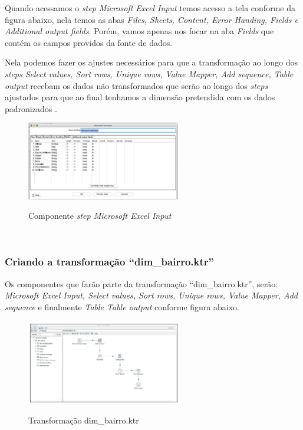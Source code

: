 Quando acessamos o \textit{step Microsoft Excel Input} temos acesso a tela conforme da figura abaixo, nela temos as abas \textit{Files, Sheets, Content, Error Handing, Fields e Additional output fields}. Por\'{e}m, vamos apenas nos focar na aba \textit{Fields} que cont\'{e}m os campos providos da fonte de dados. 

Nela podemos fazer os ajustes necess\'{a}rios para que a transforma\c{c}\~{a}o ao longo dos \textit{steps Select values, Sort rows, Unique rows, Value Mapper, Add sequence, Table output} recebam os dados n\~{a}o transformados que ser\~{a}o ao longo dos \textit{steps} ajustados para que ao final tenhamos a dimens\~{a}o pretendida com os dados padronizados .

\begin{figure}[H]
	\vspace*{0,2cm}
    \centering
    \caption{Componente \textit{step Microsoft Excel Input}}
    \includegraphics[width=0.6\textwidth]{./04-figuras/figura-componente-step-mei.png}
    \label{fig:ilustfigcomponentestepmei}
\end{figure}
\vspace*{-0,9cm}
{\raggedright {}} \\


\subsubsection{Criando a transforma\c{c}\~{a}o ``dim\_bairro.ktr''}

Os componentes que far\~{a}o parte da transforma\c{c}\~{a}o ``dim\_bairro.ktr'', ser\~{a}o: \textit{Microsoft Excel Input, Select values, Sort rows, Unique rows, Value Mapper, Add sequence} e finalmente \textit{Table Table output} conforme figura abaixo.

\begin{figure}[H]
	\vspace*{0,2cm}
    \centering
    \caption{Transforma\c{c}\~{a}o dim\_bairro.ktr}
    \includegraphics[width=0.6\textwidth]{./04-figuras/figura-dim-bairro}
    \label{fig:ilustfigdimbairro}
\end{figure}
\vspace*{-0,9cm}
{\raggedright {}} \\

